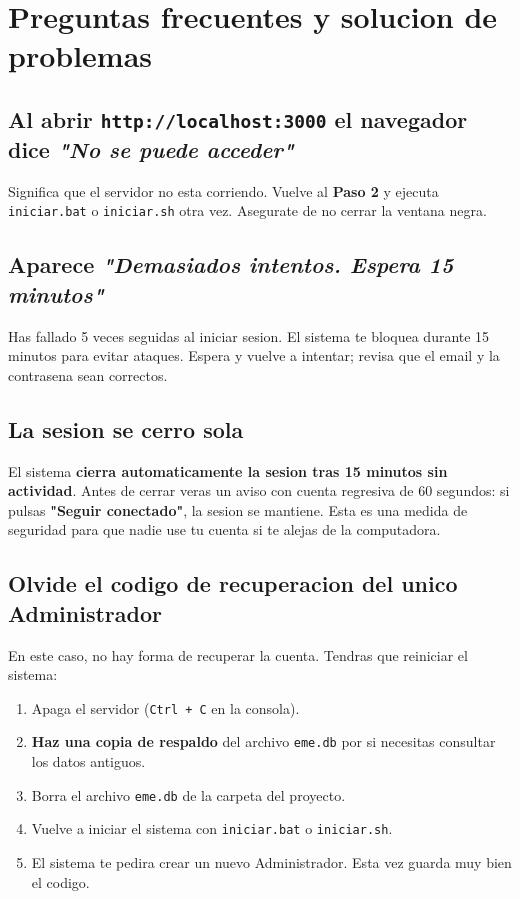 \documentclass[11pt,a4paper]{article}
\begin{document}
\section{Preguntas frecuentes y solucion de problemas}

\subsection*{Al abrir \texttt{http://localhost:3000} el navegador dice \textit{"No se puede acceder"}}

Significa que el servidor no esta corriendo. Vuelve al \textbf{Paso 2} y ejecuta \texttt{iniciar.bat} o \texttt{iniciar.sh} otra vez. Asegurate de no cerrar la ventana negra.
\subsection*{Aparece \textit{"Demasiados intentos. Espera 15 minutos"}}

Has fallado 5 veces seguidas al iniciar sesion. El sistema te bloquea durante 15 minutos para evitar ataques. Espera y vuelve a intentar; revisa que el email y la contrasena sean correctos.

\subsection*{La sesion se cerro sola}

El sistema \textbf{cierra automaticamente la sesion tras 15 minutos sin actividad}. Antes de cerrar veras un aviso con cuenta regresiva de 60 segundos: si pulsas \textbf{"Seguir conectado"}, la sesion se mantiene. Esta es una medida de seguridad para que nadie use tu cuenta si te alejas de la computadora.
\subsection*{Olvide el codigo de recuperacion del unico Administrador}

En este caso, no hay forma de recuperar la cuenta. Tendras que reiniciar el sistema:

\begin{enumerate}
    \item Apaga el servidor (\texttt{Ctrl + C} en la consola).
    \item \textbf{Haz una copia de respaldo} del archivo \texttt{eme.db} por si necesitas consultar los datos antiguos.
    \item Borra el archivo \texttt{eme.db} de la carpeta del proyecto.
    \item Vuelve a iniciar el sistema con \texttt{iniciar.bat} o \texttt{iniciar.sh}.
    \item El sistema te pedira crear un nuevo Administrador. Esta vez guarda muy bien el codigo.
\end{enumerate}
\end{document}
